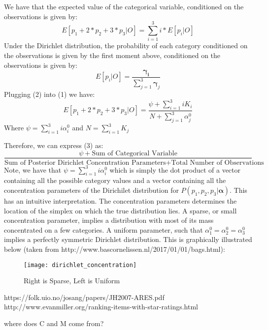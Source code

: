 \documentclass{article}
\theoremstyle{plain}
\theoremstyle{definition}
\theoremstyle{remark}
\renewcommand{\vec}[1]{\bm{#1}}
\begin{document}
\noindent We have that the expected value of the categorical variable, conditioned on the observations is given by:
\begin{equation}
E[p_{1} + 2*p_{2} + 3*p_{3}|O] = \sum_{i=1}^{3} i * E[p_{i} | O]
\end{equation}
\noindent Under the Dirichlet distribution, the probability of each category conditioned on the observations is given by the first moment above, conditioned on the observations is given by:
\begin{equation}
E[p_{i}|O] = \frac{\vec{\gamma_{i}}}{\sum_{j=1}^{3}\boldsymbol \gamma_{j}}
\end{equation}
Plugging (2) into (1) we have:
\begin{equation}
E[p_{1} + 2*p_{2} + 3*p_{3}|O] = \frac{\psi + \sum_{i=1}^{3} iK_{i}}{N + \sum_{j=1}^{3}\alpha_{j}^{0}}
\end{equation}
Where $\psi = \sum_{i=1}^{3}i\alpha_{i}^{0}$ and $N = \sum_{i=1}^{3}K_{j}$

Therefore, we can express (3) as:
\begin{equation}
\frac{\psi + \text{Sum of Categorical Variable}}{\text{Sum of Posterior Dirichlet Concentration Parameters} + \text{Total Number of Observations}}
\end{equation}
Note, we have that $\psi = \sum_{i=1}^{3}i\alpha_{i}^{0}$ which is simply the dot product of a vector containing all the possible category values and a vector containing all the concentration parameters of the Dirichilet distribution for $P(p_{1}, p_{2}, p_{3}|\boldsymbol \alpha)$. This has an intuitive interpretation. The concentration parameters determines the location of the simplex on which the true distribution lies. A sparse, or small concentration parameter, implies a distribution with most of its mass concentrated on a few categories. A uniform parameter, such that $\alpha_{1}^{0} = \alpha_{2}^{0}= \alpha_{3}^{0}$ implies a perfectly symmetric Dirichlet distribution. This is graphically illustrated below (taken from http://www.bascornelissen.nl/2017/01/01/bags.html):
\begin{figure}[H]
	\centering
    \caption{Right is Sparse, Left is Uniform}
	\texttt{[image: dirichlet\_concentration]}
\end{figure}

https://folk.uio.no/josang/papers/JH2007-ARES.pdf
http://www.evanmiller.org/ranking-items-with-star-ratings.html

where does C and M come from?
\end{document}
